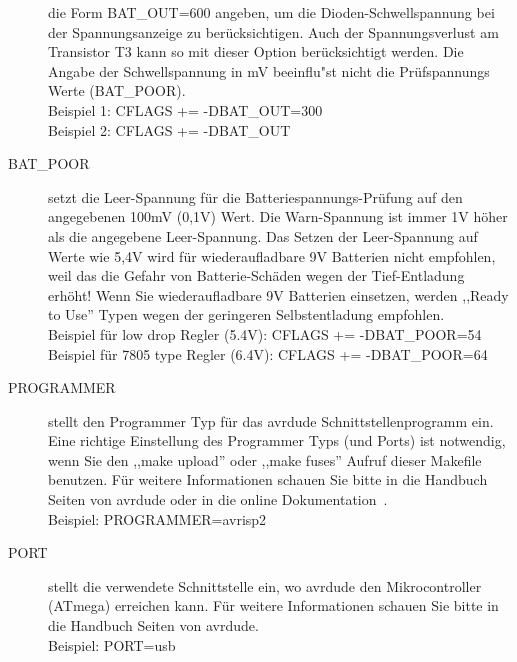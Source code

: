 \begin{description}
die Form BAT\_OUT=600 angeben, um die Dioden-Schwellspannung 
bei der Spannungsanzeige zu ber\"ucksichtigen.
Auch der Spannungsverlust am Transistor T3 kann so mit dieser Option ber\"ucksichtigt werden.
Die Angabe der Schwellspannung in mV beeinflu"st nicht die Pr\"uf\-span\-nungs Werte (BAT\_POOR).\\
Beispiel 1: CFLAGS += -DBAT\_OUT=300 \\
Beispiel 2: CFLAGS += -DBAT\_OUT
  \item[BAT\_POOR] setzt die Leer-Spannung f\"ur die Batteriespannungs-Pr\"ufung auf den angegebenen 100mV (0,1V) Wert.
Die Warn-Spannung ist immer 1V h\"oher als die angegebene Leer-Spannung.
Das Setzen der Leer-Spannung auf Werte wie 5,4V wird f\"ur wiederaufladbare 9V Batterien nicht empfohlen,
weil das die Gefahr von Batterie-Sch\"aden wegen der Tief-Entladung erh\"oht!
Wenn Sie wiederaufladbare 9V Batterien einsetzen, werden ,,Ready to Use'' Typen wegen der geringeren Selbstentladung empfohlen.\\
Beispiel f\"ur low drop Regler (5.4V): CFLAGS += -DBAT\_POOR=54 \\
Beispiel f\"ur 7805 type Regler (6.4V): CFLAGS += -DBAT\_POOR=64
  \item[PROGRAMMER] stellt den Programmer Typ f\"ur das avrdude Schnittstellenprogramm ein.
Eine richtige Einstellung des Programmer Typs (und Ports) ist notwendig, wenn Sie den ,,make upload'' oder
,,make fuses'' Aufruf dieser Makefile benutzen.
F\"ur weitere Informationen schauen Sie bitte in die Handbuch Seiten von avrdude oder in die online Dokumentation~\cite{avrdude}.\\
Beispiel: PROGRAMMER=avrisp2
  \item[PORT] stellt die verwendete Schnittstelle ein, wo avrdude den Mikrocontroller (ATmega) erreichen kann.
F\"ur weitere Informationen schauen Sie bitte in die Handbuch Seiten von avrdude.\\
Beispiel: PORT=usb

\end{description}

